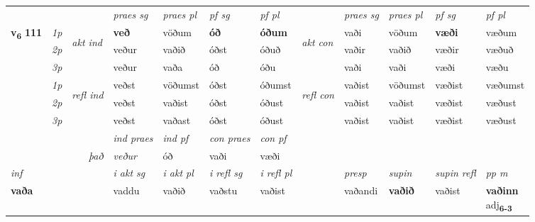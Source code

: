 \begin{longtable}[l]{X>{\footnotesize\itshape}llXXXXlXXXX}
\midrule

 & &   & \textit{praes sg}  & \textit{praes pl}    & \textit{ pf sg} & \textit{pf pl} & & \textit{praes sg}  & \textit{praes pl}    & \textit{pf sg} & \textit{pf pl }  \\ \cmidrule{4-7} \cmidrule{9-12}
 \multirow{2}{*}{{{\textbf{v{\textsubscript{6}}} \Large{\textbf{111}}}}}  & 1p & \multirow{3}{*}{\begin{turn}{90}\textit{akt ind}\end{turn}} & \textbf{veð} & vöðum & \textbf{óð} & \textbf{óðum} & \multirow{3}{*}{\begin{turn}{90}\textit{akt con}\end{turn}} &vaði & vöðum & \textbf{væði} & væðum\\*
 & 2p &  &  veður  & vaðið & óðst & óðuð & & vaðir & vaðið & væðir & væðuð \\*
 & 3p &  & veður & vaða & óð & óðu & & vaði & vaði& væði & væðu \\*
\cmidrule{4-7} \cmidrule{9-12}
 & 1p & \multirow{3}{*}{\begin{turn}{90}\textit{refl ind}\end{turn}}  & veðst & vöðumst & óðst & óðumst & \multirow{3}{*}{\begin{turn}{90}\textit{refl con}\end{turn}}  &vaðist & vöðumst & væðist & væðumst \\*
 & 2p &  & veðst & vaðist & óðst & óðust & &vaðist & vaðist & væðist & væðust \\*
 & 3p  & & veðst & vaðast & óðst & óðust & & vaðist & vaðist& væðist & væðust \\*
\cmidrule{4-7} \cmidrule{9-12}

   && &  \textit{ind praes} & \textit{ind pf} & \textit{con praes} & \textit{con pf} \\*
\multicolumn{3}{r}{\textit{það}} & veður & óð & vaði & væði \\*

\cmidrule{4-7}
   {\textit{inf}} & &  & \textit{i akt sg} & \textit{i akt pl} & \textit{i refl sg} & \textit{i refl pl} && \textit{presp} & \textit{supin} & \textit{supin refl} & \textit{pp m} \\*
  {\textbf{vaða}} & && vaddu  & vaðið & vaðstu & vaðist && vaðandi &  \textbf{vaðið} & vaðist & \specialcell{\textbf{vaðinn} \\ adj\textbf{\textsubscript{6-3}}} \\*

\midrule


\end{longtable}

